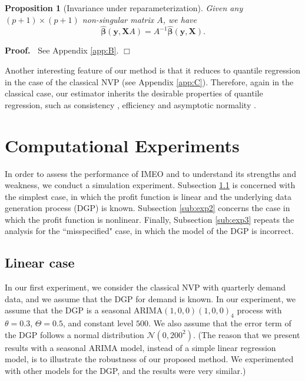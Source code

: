 \documentclass{article}
\newtheorem{proposition}{Proposition}
\newenvironment{proof}
 {\begin{trivlist} \item[] {\bf Proof.\ }}{\hfill$\Box$ \end{trivlist}}
\begin{document}
\begin{proposition}[Invariance under reparameterization]
Given any $(p+1)\times (p+1)$ non-singular matrix $A$, we have
\[
        \hat{\boldsymbol{\beta}}(\mathbf{y},\mathbf{X}A)=A^{-1}\hat{\boldsymbol{\beta}}(\mathbf{y},\mathbf{X}).
\]
\end{proposition}
\begin{proof}
See Appendix \ref{app:B}.
\end{proof}

Another interesting feature of our method is that it reduces to quantile regression in the case of the classical NVP (see Appendix \ref{app:C}). Therefore, again in the classical case, our estimator
inherits the desirable properties of quantile regression, such as
consistency \cite{Koe05}, efficiency \cite{KM99} and asymptotic
normality \cite{KHM05}.

\section{Computational Experiments} \label{se:results}

In order to assess the performance of IMEO and to understand its strengths and weakness, we conduct a simulation experiment. Subsection \ref{sub:exp1} is concerned with the simplest case, in which the profit function is linear and the underlying data generation process (DGP) is known. Subsection \ref{sub:exp2} concerns the case in which the profit function is nonlinear. Finally, Subsection \ref{sub:exp3} repeats the analysis for the ``misspecified" case, in which the model of the DGP is incorrect.

\subsection{Linear case} \label{sub:exp1}

In our first experiment, we consider the classical NVP with quarterly demand data, and we assume that the DGP for demand is known. In our experiment, we assume that the DGP is a seasonal ARIMA$(1,0,0)(1,0,0)_4$ process with $\theta=0.3$, $\Theta=0.5$, and constant level $500$. We also assume that the error term of the DGP follows a normal distribution $\mathcal{N}(0,200^2)$.
(The reason that we present results with a seasonal ARIMA model, instead of a simple linear regression model, is to illustrate the robustness of our proposed method. We experimented with other models for the DGP, and the results were very similar.)
\end{document}
